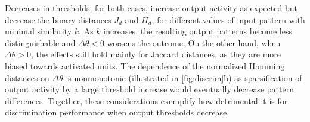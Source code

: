 Decreases in thresholds, for both cases, increase output activity as expected
        but decrease the binary distances $J_d$ and $H_d$,
        for different values of input pattern with minimal similarity $k$.
    As $k$ increases, the resulting output patterns become less distinguishable and $\Delta \theta < 0$ worsens the outcome.
    On the other hand, when $\Delta \theta > 0$, the effects still hold mainly for Jaccard distances,
        as they are more biased towards activated units.
    The dependence of the normalized Hamming distances on $\Delta \theta$ is nonmonotonic
        (illustrated in \autoref{fig:discrim}b)
        as sparsification of output activity by a large threshold increase would eventually decrease pattern differences.
    Together, these considerations exemplify how detrimental it is for discrimination performance when output thresholds decrease.
